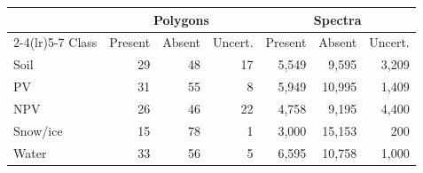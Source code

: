 \begin{tabular}{lrrrrrr}
\toprule
 & \multicolumn{3}{c}{Polygons} & \multicolumn{3}{c}{Spectra} \\
\cmidrule(lr){2-4}\cmidrule(lr){5-7}
Class & Present & Absent & Uncert. & Present & Absent & Uncert. \\
\midrule
Soil & 29 & 48 & 17 & 5,549 & 9,595 & 3,209 \\
PV & 31 & 55 & 8 & 5,949 & 10,995 & 1,409 \\
NPV & 26 & 46 & 22 & 4,758 & 9,195 & 4,400 \\
Snow/ice & 15 & 78 & 1 & 3,000 & 15,153 & 200 \\
Water & 33 & 56 & 5 & 6,595 & 10,758 & 1,000 \\
\bottomrule
\end{tabular}
